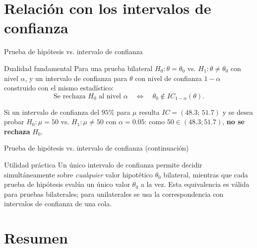 \documentclass[aspectratio=169,11pt]{beamer}
\begin{document}
\section{Relación con los intervalos de confianza}

\begin{frame}{Prueba de hipótesis vs. intervalo de confianza}
\begin{block}{Dualidad fundamental}
Para una prueba bilateral $H_0:\theta=\theta_0$ vs. $H_1:\theta\neq\theta_0$ con nivel $\alpha$, y un intervalo de confianza para $\theta$ con nivel de confianza $1-\alpha$ construido con el mismo estadístico:
\[
\text{Se rechaza } H_0 \text{ al nivel } \alpha \quad \Longleftrightarrow \quad \theta_0 \notin IC_{1-\alpha}(\theta).
\]
\end{block}

\begin{example}
Si un intervalo de confianza del $95\%$ para $\mu$ resulta $IC = (48.3;\,51.7)$ y se desea probar $H_0:\mu=50$ vs. $H_1:\mu\neq50$ con $\alpha=0.05$: como $50 \in (48.3;51.7)$, \textbf{no se rechaza} $H_0$.
\end{example}

\end{frame}

\begin{frame}{Prueba de hipótesis vs. intervalo de confianza (continuación)}
\begin{alertblock}{Utilidad práctica}
Un único intervalo de confianza permite decidir simultáneamente sobre \emph{cualquier} valor hipotético $\theta_0$ bilateral, mientras que cada prueba de hipótesis evalúa un único valor $\theta_0$ a la vez. Esta equivalencia es válida para pruebas bilaterales; para unilaterales se usa la correspondencia con intervalos de confianza de una cola.
\end{alertblock}
\end{frame}

\section{Resumen}
\end{document}
